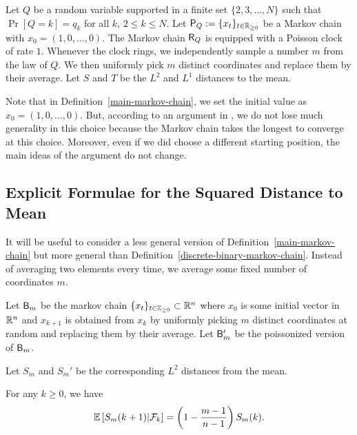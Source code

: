 \documentclass[12pt]{article}
\begin{document}
\begin{defn} \label{main-markov-chain}
	Let $Q$ be a random variable supported in a finite set $\{2, 3, \ldots, N\}$ such that $\Pr[Q = k] = q_k$ for all $k$, $2 \leq k \leq N$. Let $\mathsf{P}_Q := \{x_t\}_{t \in \mathbb{R}_{\geq 0}}$ be a Markov chain with $x_0 = (1, 0, \ldots, 0)$. The Markov chain $\mathsf{R}_Q$ is equipped with a Poisson clock of rate $1$. Whenever the clock rings, we independently sample a number $m$ from the law of $Q$. We then uniformly pick $m$ distinct coordinates and replace them by their average. Let $S$ and $T$ be the $L^2$ and $L^1$ distances to the mean. 
\end{defn} 

Note that in Definition~\ref{main-markov-chain}, we set the initial value as $x_0 = (1, 0, \ldots, 0)$. But, according to an argument in \cite{chatterjee2021phase}, we do not lose much generality in this choice because the Markov chain takes the longest to converge at this choice. Moreover, even if we did choose a different starting position, the main ideas of the argument do not change.

\subsection{Explicit Formulae for the Squared Distance to Mean} 

It will be useful to consider a less general version of Definition~\ref{main-markov-chain} but more general than Definition~\ref{discrete-binary-markov-chain}. Instead of averaging two elements every time, we average some fixed number of coordinates $m$. 

\begin{defn}
	Let $\mathsf{B}_m$ be the markov chain $\{x_t\}_{t \in \mathbb{Z}_{\geq 0} } \subset \mathbb{R}^n$ where $x_0$ is some initial vector in $\mathbb{R}^n$ and $x_{k+1}$ is obtained from $x_k$ by uniformly picking $m$ distinct coordinates at random and replacing them by their average. Let $\mathsf{B}_m'$ be the poissonized version of $\mathsf{B}_m$. 
\end{defn}

Let $S_m$ and $S_m'$ be the corresponding $L^2$ distances from the mean.

\begin{prop} \label{explicit-formula-1}
	For any $k \geq 0$, we have 
	\[
		\mathbb{E} \left [ S_m(k+1) | \mathcal{F}_k \right ] = \left ( 1 - \frac{m-1}{n-1} \right ) S_m(k).	
	\]
\end{prop}
\end{document}
